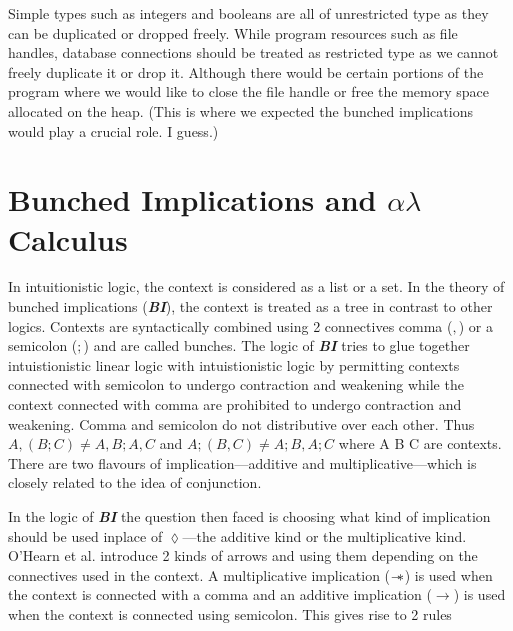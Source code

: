 Simple types such as integers and booleans are all of unrestricted type as
they can be duplicated or dropped freely.
While program resources such as file handles, database connections
should be treated as restricted type as we cannot freely duplicate it
or drop it. Although there would be certain portions of the program where we would
like to close the file handle or free the memory space allocated on the heap.
(This is where we expected the bunched implications would play a crucial role. I guess.)

\section{Bunched Implications and $\alpha\lambda$ Calculus}

In intuitionistic logic, the context is considered as a list or a set. In the theory of
bunched implications (\textbf{\em BI}), the context is treated as a tree in contrast to other logics. Contexts are syntactically
combined using 2 connectives comma ($,$) or a semicolon ($;$) and are called bunches. The logic of \textbf{\em BI}
tries to glue together intuistionistic linear logic with intuistionistic logic by
permitting contexts connected with semicolon to undergo contraction and weakening while the context connected with comma
are prohibited to undergo contraction and weakening. Comma and semicolon do not distributive over each other.
Thus $A,(B;C) \neq A, B ; A,C$ and $A;(B,C) \neq A;B,A;C$ where A B C are contexts.
There are two flavours of implication---additive and multiplicative---which is closely related to the idea of conjunction.
\begin{framed}
\begin{minipage}{1.0\linewidth}
  \begin{prooftree}
  \end{prooftree}
\end{minipage}
\end{framed}
In the logic of {\textbf{\em BI}} the question then faced is choosing what kind of
implication should be used inplace of $\lozenge$---the additive kind or the multiplicative kind.
O'Hearn et al. \citeyearpar{ohearn_logic_1999} introduce 2 kinds of arrows
and using them depending on the connectives used in the context. A multiplicative implication ($\sepimp$)
is used when the context is connected with a comma and an additive implication ($\rightarrow$) is used when the
context is connected using semicolon. This gives rise to 2 rules
